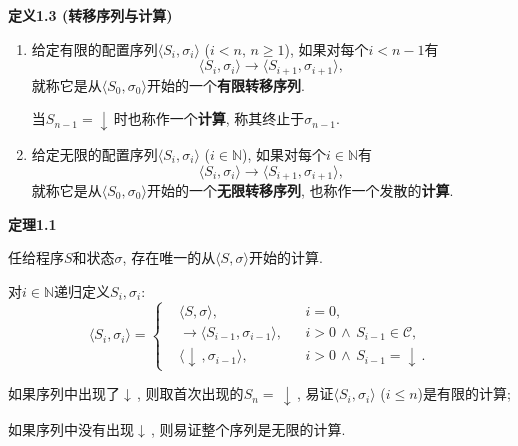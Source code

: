 \documentclass[UTF8]{ctexart}
\begin{document}
\vspace{10pt}

\hypertarget{sec:定义1.3}{}
\noindent\textbf{定义1.3 (转移序列与计算)}

\begin{enumerate}
    \item 给定有限的配置序列$\langle S_i,\sigma_i\rangle$ ($i<n,\,n\geqslant 1$),
    如果对每个$i<n-1$有
    \[
        \langle S_i,\sigma_i\rangle\to\langle S_{i+1},\sigma_{i+1}\rangle,
    \]
    就称它是从$\langle S_0,\sigma_0\rangle$开始的一个\textbf{有限转移序列}.

    \hspace{2.17em}
    当$S_{n-1}=\downarrow\,$时也称作一个\textbf{计算},
    称其终止于$\sigma_{n-1}$.

    \item 给定无限的配置序列$\langle S_i,\sigma_i\rangle$ ($i\in\mathbb{N}$),
    如果对每个$i\in\mathbb{N}$有
    \[
        \langle S_i,\sigma_i\rangle\to\langle S_{i+1},\sigma_{i+1}\rangle,
    \]
    就称它是从$\langle S_0,\sigma_0\rangle$开始的一个\textbf{无限转移序列},
    也称作一个发散的\textbf{计算}.
\end{enumerate}

\vspace{10pt}

\hypertarget{sec:定理1.1}{}
\noindent\textbf{定理1.1}

任给程序$S$和状态$\sigma$, 存在唯一的从$\langle S,\sigma\rangle$开始的计算.



对$i\in\mathbb{N}$递归定义$S_i,\sigma_i$:
\[\langle S_i,\sigma_i\rangle=\left\{\begin{aligned}
    &\langle S,\sigma\rangle,&&i=0,\\
    &\to\langle S_{i-1},\sigma_{i-1}\rangle,&&i>0\,\land\,S_{i-1}\in\mathcal{C},\\
    &\langle\downarrow\,,\sigma_{i-1}\rangle,&&i>0\,\land\,S_{i-1}=\downarrow\,.
\end{aligned}\right.\]

\vspace{3pt}
如果序列中出现了$\downarrow\,$, 则取首次出现的$S_n=\,\downarrow\,$,
易证$\langle S_i,\sigma_i\rangle$ ($i\leqslant n$)是有限的计算;

如果序列中没有出现$\downarrow\,$, 则易证整个序列是无限的计算.

\end{document}
